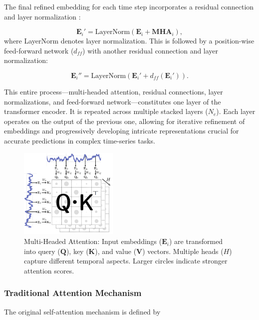 \documentclass{ieeetmlcn}
\begin{document}
The final refined embedding for each time step incorporates a residual connection \cite{he2016deep} and layer normalization \cite{lei2016layer}:

\begin{equation}
    \mathbf{E}_i' = \text{LayerNorm}(\mathbf{E}_i + \mathbf{MHA}_i),
\end{equation}
where LayerNorm denotes layer normalization. This is followed by a position-wise feed-forward network ($d_{ff}$) with another residual connection and layer normalization:

\begin{equation}
    \mathbf{E}_i'' = \text{LayerNorm}(\mathbf{E}_i' + d_{ff}(\mathbf{E}_i')).
\end{equation}

This entire process—multi-headed attention, residual connections, layer normalizations, and feed-forward network—constitutes one layer of the transformer encoder. It is repeated across multiple stacked layers ($N_e$). Each layer operates on the output of the previous one, allowing for iterative refinement of embeddings and progressively developing intricate representations crucial for accurate predictions in complex time-series tasks.

\begin{figure}
\centering
\includegraphics[width=0.42\textwidth]{img/attention_workings.pdf}
\caption{Multi-Headed Attention: Input embeddings ($\mathbf{E}_i$) are transformed into query ($\mathbf{Q}$), key ($\mathbf{K}$), and value ($\mathbf{V}$) vectors. Multiple heads ($H$) capture different temporal aspects. Larger circles indicate stronger attention scores.}
\label{fig:attention_workings}
\end{figure}

\subsubsection*{Traditional Attention Mechanism}

The original self-attention mechanism \cite{vaswani2017attention} is defined by
\end{document}
